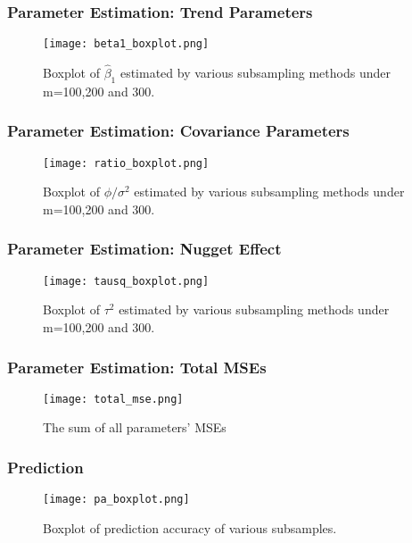 \documentclass{beamer}
\begin{document}
\begin{frame}
\frametitle{Parameter Estimation: Trend Parameters}
\begin{figure}
  \centering
  \texttt{[image: beta1\_boxplot.png]}\\
  \caption{Boxplot of $\hat{\beta}_1$ estimated by various subsampling methods under m=100,200 and 300.}\label{Figure 5.1}
\end{figure}
\end{frame}

\begin{frame}
\frametitle{Parameter Estimation: Covariance Parameters}
\begin{figure}
  \centering
  \texttt{[image: ratio\_boxplot.png]}\\
  \caption{Boxplot of $\phi/\sigma^2$ estimated by various subsampling methods under m=100,200 and 300.}\label{Figure 5.2}
\end{figure}
\end{frame}

\begin{frame}
\frametitle{Parameter Estimation: Nugget Effect}
\begin{figure}
  \centering
  \texttt{[image: tausq\_boxplot.png]}\\
  \caption{Boxplot of $\tau^2$ estimated by various subsampling methods under m=100,200 and 300.}\label{Figure 5.3}
\end{figure}
\end{frame}

\begin{frame}
\frametitle{Parameter Estimation: Total MSEs}
\begin{figure}
  \centering
  \texttt{[image: total\_mse.png]}\\
  \caption{The sum of all parameters' MSEs}\label{Figure 5.1}
\end{figure}
\end{frame}

\begin{frame}
\frametitle{Prediction}
\begin{figure}
  \centering
  \texttt{[image: pa\_boxplot.png]}\\
  \caption{Boxplot of prediction accuracy of various subsamples.}\label{Figure 6}
\end{figure}
\end{frame}
\end{document}
